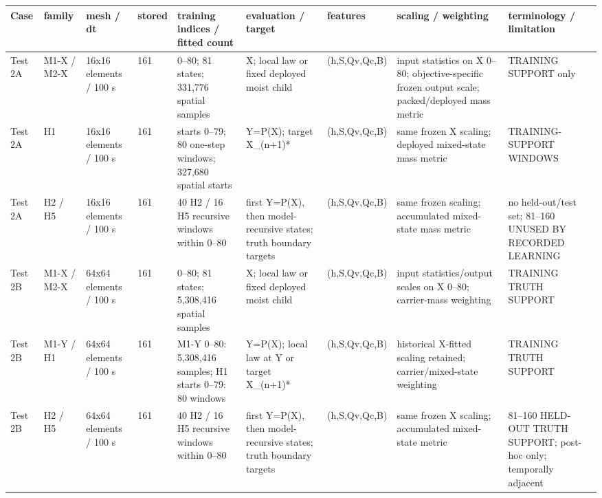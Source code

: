 \begin{tabular}{lllllllll}
\hline
Case & family & mesh / dt & stored & training indices / fitted count & evaluation / target & features & scaling / weighting & terminology / limitation \\
\hline
Test 2A & M1-X / M2-X & 16x16 elements / 100 s & 161 & 0--80; 81 states; 331,776 spatial samples & X; local law or fixed deployed moist child & (h,S,Qv,Qc,B) & input statistics on X 0--80; objective-specific frozen output scale; packed/deployed mass metric & TRAINING SUPPORT only \\
Test 2A & H1 & 16x16 elements / 100 s & 161 & starts 0--79; 80 one-step windows; 327,680 spatial starts & Y=P(X); target X\_(n+1)* & (h,S,Qv,Qc,B) & same frozen X scaling; deployed mixed-state mass metric & TRAINING-SUPPORT WINDOWS \\
Test 2A & H2 / H5 & 16x16 elements / 100 s & 161 & 40 H2 / 16 H5 recursive windows within 0--80 & first Y=P(X), then model-recursive states; truth boundary targets & (h,S,Qv,Qc,B) & same frozen scaling; accumulated mixed-state mass metric & no held-out/test set; 81--160 UNUSED BY RECORDED LEARNING \\
Test 2B & M1-X / M2-X & 64x64 elements / 100 s & 161 & 0--80; 81 states; 5,308,416 spatial samples & X; local law or fixed deployed moist child & (h,S,Qv,Qc,B) & input statistics/output scales on X 0--80; carrier-mass weighting & TRAINING TRUTH SUPPORT \\
Test 2B & M1-Y / H1 & 64x64 elements / 100 s & 161 & M1-Y 0--80: 5,308,416 samples; H1 starts 0--79: 80 windows & Y=P(X); local law at Y or target X\_(n+1)* & (h,S,Qv,Qc,B) & historical X-fitted scaling retained; carrier/mixed-state weighting & TRAINING TRUTH SUPPORT \\
Test 2B & H2 / H5 & 64x64 elements / 100 s & 161 & 40 H2 / 16 H5 recursive windows within 0--80 & first Y=P(X), then model-recursive states; truth boundary targets & (h,S,Qv,Qc,B) & same frozen X scaling; accumulated mixed-state metric & 81--160 HELD-OUT TRUTH SUPPORT; post-hoc only; temporally adjacent \\
\hline
\end{tabular}
